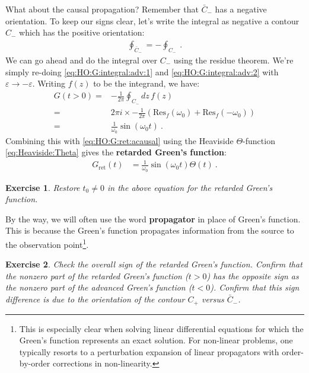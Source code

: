 \documentclass[
  11pt,
	colorful,
	raggedright,
]{tufte-style-thesis-flip}
\newtheorem{exercise}{Exercise}[section]
\begin{document}
What about the causal propagation? Remember that $\bar C_{-}$ has a negative orientation. To keep our signs clear, let's write the integral as negative a contour $C_-$  which has the positive orientation: 
\begin{align}
  \oint_{\bar C_-} = -\oint_{C_-} \ .
\end{align}
We can go ahead and do the integral over $C_-$ using the residue theorem. We're simply re-doing \eqref{eq:HO:G:integral:adv:1} and \eqref{eq:HO:G:integral:adv:2} with $\varepsilon\to -\varepsilon$. Writing $f(z)$ to be the integrand, we have:
\begin{align}
  G(t>0) =& 
  -\frac{1}{2\pi} \oint_{C_-}dz\, f(z)
  \\
  =&
  2\pi i \times -\frac{1}{2\pi} 
  \left(\text{Res}_f(\omega_0) + \text{Res}_f(-\omega_0)\right)
  \\
  =& \frac{1}{\omega_0}\sin(\omega_0 t) \ .
\end{align}
Combining this with \eqref{eq:HO:G:ret:acausal} using the Heaviside $\Theta$-function \eqref{eq:Heaviside:Theta} gives the \textbf{retarded Green's function}:
\begin{align}
  G_\text{ret}(t) &= 
  \frac{1}{\omega_0}
  \sin(\omega_0 t)
  \Theta(t) \ .
  \label{eq:HO:Gret:sin:theta}
\end{align}
\begin{exercise}
Restore $t_0\neq 0$ in the above equation for the retarded Green's function.
\end{exercise}
By the way, we will often use the word \textbf{propagator} in place of Green's function. This is because the Green's function propagates information from the source to the observation point\footnote{This is especially clear when solving linear differential equations for which the Green's function represents an exact solution. For non-linear problems, one typically resorts to a perturbation expansion of linear propagators with order-by-order corrections in non-linearity. %
}. 

\begin{exercise}
Check the overall sign of the retarded Green's function.  Confirm that the nonzero part of the retarded Green's function ($t>0$) has the opposite sign as the nonzero part of the advanced Green's function ($t<0$). Confirm that this sign difference is due to the orientation of the contour $C_+$ versus $\bar{C}_-$.
\end{exercise}
\end{document}
